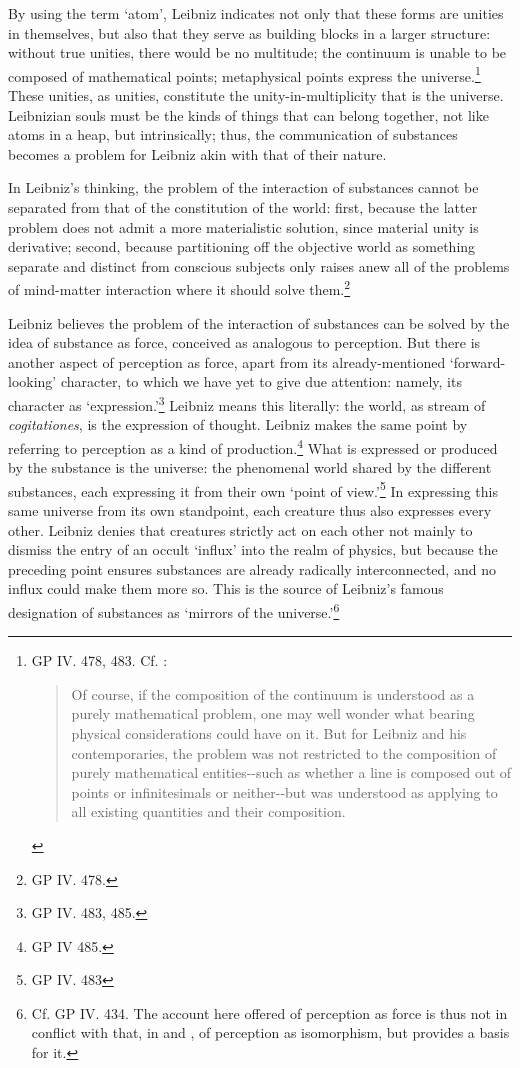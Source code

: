 \documentclass{article}
\begin{document}
By using the term `atom', Leibniz indicates not only that these forms
are unities in themselves, but also that they serve as building blocks
in a larger structure: without true unities, there would be no
multitude; the continuum is unable to be composed of mathematical
points; metaphysical points express the universe.\footnote{GP IV. 478,
  483. Cf. \autocite{Arthur1998}:

  \begin{quote}
  Of course, if the composition of the continuum is understood as a
  purely mathematical problem, one may well wonder what bearing physical
  considerations could have on it. But for Leibniz and his
  contemporaries, the problem was not restricted to the composition of
  purely mathematical entities-\/-such as whether a line is composed out
  of points or infinitesimals or neither-\/-but was understood as
  applying to all existing quantities and their composition.
  \end{quote}} These unities, as unities, constitute the
unity-in-multiplicity that is the universe. Leibnizian souls must be the
kinds of things that can belong together, not like atoms in a heap, but
intrinsically; thus, the communication of substances becomes a problem
for Leibniz akin with that of their nature.

In Leibniz's thinking, the problem of the interaction of substances
cannot be separated from that of the constitution of the world: first,
because the latter problem does not admit a more materialistic solution,
since material unity is derivative; second, because partitioning off the
objective world as something separate and distinct from conscious
subjects only raises anew all of the problems of mind-matter interaction
where it should solve them.\footnote{GP IV. 478.}

Leibniz believes the problem of the interaction of substances can be
solved by the idea of substance as force, conceived as analogous to
perception. But there is another aspect of perception as force, apart
from its already-mentioned `forward-looking' character, to which we have
yet to give due attention: namely, its character as
`expression.'\footnote{GP IV. 483, 485.} Leibniz means this literally:
the world, as stream of \emph{cogitationes}, is the expression of
thought. Leibniz makes the same point by referring to perception as a
kind of production.\footnote{GP IV 485.} What is expressed or produced
by the substance is the universe: the phenomenal world shared by the
different substances, each expressing it from their own `point of
view.'\footnote{GP IV. 483} In expressing this same universe from its
own standpoint, each creature thus also expresses every other. Leibniz
denies that creatures strictly act on each other not mainly to dismiss
the entry of an occult `influx' into the realm of physics, but because
the preceding point ensures substances are already radically
interconnected, and no influx could make them more so. This is the
source of Leibniz's famous designation of substances as `mirrors of the
universe.'\footnote{Cf. GP IV. 434. The account here offered of
  perception as force is thus not in conflict with that, in \autocite{Simmons2001}
  and \autocite{Puryear2006}, of perception as isomorphism, but provides a basis
  for it.}
\end{document}
